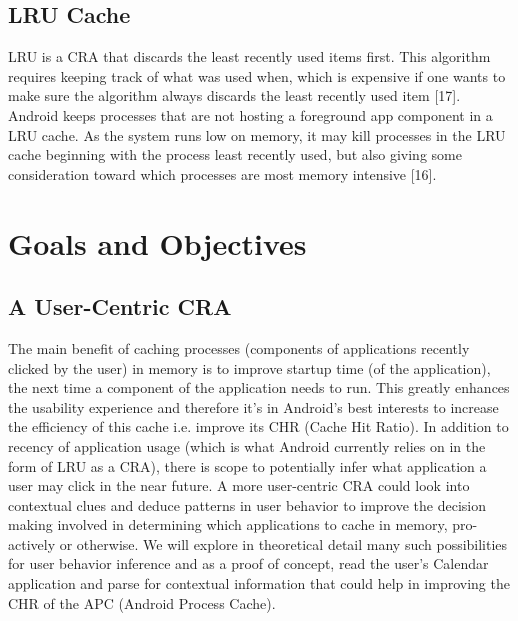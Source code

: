 \documentclass[12pt]{uthesis-v12}  %
\begin{document}
		\subsection{LRU Cache}
			LRU is a CRA that discards the least recently used items first. This algorithm requires keeping track of what was used when, which is expensive if one wants to make sure the algorithm always discards the least recently used item [17]. Android keeps processes that are not hosting a foreground app component in a LRU cache. As the system runs low on memory, it may kill processes in the LRU cache beginning with the process least recently used, but also giving some consideration toward which processes are most memory intensive [16].
			
	\section{Goals and Objectives}
		
		\subsection{A User-Centric CRA}
			The main benefit of caching processes (components of applications recently clicked by the user) in memory is to improve startup time (of the application), the next time a component of the application needs to run. This greatly enhances the usability experience and therefore it's in Android's best interests to increase the efficiency of this cache i.e. improve its CHR (Cache Hit Ratio). In addition to recency of application usage (which is what Android currently relies on in the form of LRU as a CRA), there is scope to potentially infer what application a user may click in the near future. A more user-centric CRA could look into contextual clues and deduce patterns in user behavior to improve the decision making involved in determining which applications to cache in memory, pro-actively or otherwise. We will explore in theoretical detail many such possibilities for user behavior inference and as a proof of concept, read the user's Calendar  application and parse for contextual information that could help in improving the CHR of the APC (Android Process Cache). 
\end{document}

